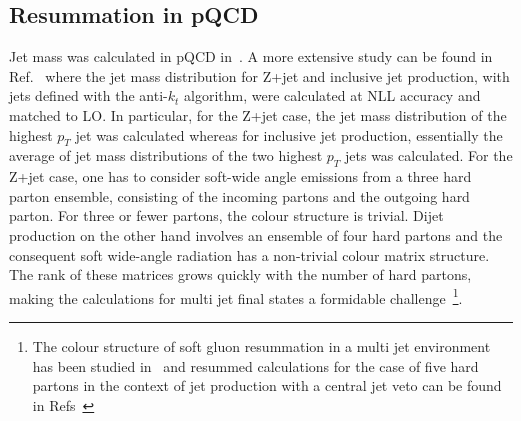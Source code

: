  










\subsection{Resummation in pQCD}
\label{subsec:pQCD}

Jet mass was calculated in pQCD in~\cite{Li:2011hy}. A more 
extensive study can be found in Ref.~\cite{Dasgupta:2012hg} where the jet mass 
distribution for Z+jet and inclusive jet production, with jets defined with the 
anti-$k_t$ algorithm, were calculated at NLL accuracy and matched to LO.
%
In particular, for the Z+jet case, the jet mass distribution of the 
highest $p_T$ jet was calculated whereas for inclusive jet production, 
essentially the average of jet mass distributions of the two highest 
$p_T$ jets was calculated.
For the Z+jet case, one has to consider soft-wide angle emissions from a
three hard parton ensemble, consisting of the incoming partons and the
outgoing hard parton.
For three or fewer partons, the colour structure is trivial. Dijet production 
on the other hand involves an ensemble of four hard partons and the 
consequent soft wide-angle radiation has a non-trivial colour matrix 
structure. The rank of these matrices grows quickly with the number 
of hard partons, making the calculations for multi jet final states a 
formidable challenge~\footnote{The colour structure of soft gluon 
resummation in a multi jet environment has been studied 
in~\cite{Sjodahl:2008fz,Sjodahl:2009wx} and resummed calculations 
for the case of five hard partons in the context of jet production 
with a central jet veto can be found in 
Refs~\cite{Kyrieleis:2005dt,Forshaw:2008cq,Forshaw:2006fk,DuranDelgado:2011tp}}.


